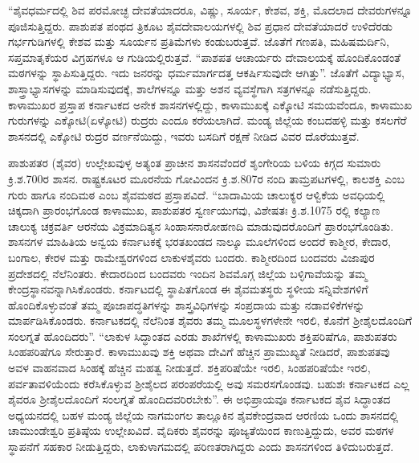 “ಶೈವಧರ್ಮದಲ್ಲಿ ಶಿವ ಪರಮೋಚ್ಛ ದೇವತೆಯಾದರೂ, ವಿಷ್ಣು, ಸೂರ್ಯ, ಕೇಶವ, ಶಕ್ತಿ, ಮೊದಲಾದ ದೇವರುಗಳನ್ನೂ ಪೂಜಿಸುತ್ತಿದ್ದರು. ಪಾಶುಪತ ಪಂಥದ ತ್ರಿಕೂಟ ಶೈವದೇವಾಲಯಗಳಲ್ಲಿ ಶಿವ ಪ್ರಧಾನ ದೇವತೆಯಾದರೆ ಉಳಿದೆರಡು ಗರ್ಭಗುಡಿಗಳಲ್ಲಿ ಕೇಶವ ಮತ್ತು ಸೂರ್ಯನ ಪ್ರತಿಮೆಗಳು ಕಂಡುಬರುತ್ತವೆ. ಜೊತೆಗೆ ಗಣಪತಿ, ಮಹಿಷಮರ್ದಿನಿ, ಸಪ್ತಮಾತೃಕೆಯರ ವಿಗ್ರಹಗಳೂ ಆ ಗುಡಿಯಲ್ಲಿರುತ್ತವೆ. “ಪಾಶಪತ ಆಚಾರ್ಯರು ದೇವಾಲಯಕ್ಕೆ ಹೊಂದಿಕೊಂಡಂತೆ ಮಠಗಳನ್ನು ಸ್ಥಾಪಿಸುತ್ತಿದ್ದರು. ಇದು ಜನರನ್ನು ಧರ್ಮಮಾರ್ಗದತ್ತ ಆಕರ್ಷಿಸುವುದೇ ಆಗಿತ್ತು”. ಜೊತೆಗೆ ವಿದ್ಯಾಭ್ಯಾಸ, ಶಾಸ್ತ್ರಾಭ್ಯಾಸಗಳನ್ನು ಮಾಡಿಸುವುದಕ್ಕೆ, ಶಾಲೆಗಳನ್ನೂ ಮತ್ತು ಅಶನ ವ್ಯವಸ್ಥೆಗಾಗಿ ಸತ್ರಗಳನ್ನೂ ನಡೆಸುತ್ತಿದ್ದರು. ಕಾಳಾಮುಖರ ಪ್ರಸ್ತಾಪ ಕರ್ನಾಟಕದ ಅನೇಕ ಶಾಸನಗಳಲ್ಲಿದ್ದು, ಕಾಳಾಮುಖಕ್ಕೆ ಎಕ್ಕೋಟಿ ಸಮಯವೆಂದೂ, ಕಾಳಾಮುಖ ಗುರುಗಳನ್ನು ಎಕ್ಕೋಟಿ(ಏಳ್ಕೋಟಿ) ರುದ್ರರು ಎಂದೂ ಕರೆಯಲಾಗಿದೆ. ಮಂಡ್ಯ ಜಿಲ್ಲೆಯ ಕಂಬದಹಳ್ಳಿ ಮತ್ತು ಕಸಲಗೆರೆ ಶಾಸನದಲ್ಲಿ ಎಕ್ಕೋಟಿ ರುದ್ರರ ವರ್ಣನೆಯಿದ್ದು, ಇವರು ಬಸದಿಗೆ ರಕ್ಷಣೆ ನೀಡಿದ ವಿವರ ದೊರೆಯುತ್ತವೆ.

ಪಾಶುಪತರ (ಶೈವರ) ಉಲ್ಲೇಖವುಳ್ಳ ಅತ್ಯಂತ ಪ್ರಾಚೀನ ಶಾಸನವೆಂದರೆ ಶೃಂಗೇರಿಯ ಬಳಿಯ ಕಿಗ್ಗದ ಸುಮಾರು ಕ್ರಿ.ಶ.700ರ ಶಾಸನ. ರಾಷ್ಟ್ರಕೂಟರ ಮೂರನೆಯ ಗೋವಿಂದನ ಕ್ರಿ.ಶ.807ರ ನಂದಿ ತಾಮ್ರಪಟಗಳಲ್ಲಿ, ಕಾಲಶಕ್ತಿ ಎಂಬ ಗುರು ಹಾಗೂ ನಂದಿಮಠ ಎಂಬ ಶೈವಮಠದ ಪ್ರಸ್ತಾಪವಿದೆ. “ಬಾದಾಮಿಯ ಚಾಲುಕ್ಯರ ಆಳ್ವಿಕೆಯ ಅವಧಿಯಲ್ಲಿ ಚಿಕ್ಕದಾಗಿ ಪ್ರಾರಂಭಗೊಂಡ ಕಾಳಾಮುಖ, ಪಾಶುಪತರ ಸ್ವರ್ಣಯುಗವು, ವಿಶೇಷತಃ ಕ್ರಿ.ಶ.1075 ರಲ್ಲಿ ಕಲ್ಯಾಣ ಚಾಲುಕ್ಯ ಚಕ್ರವರ್ತಿ ಆರನೆಯ ವಿಕ್ರಮಾದಿತ್ಯನ ಸಿಂಹಾಸನಾರೋಹಣದಿ ಮಾಡುವುದರೊಂದಿಗೆ ಪ್ರಾರಂಭಗೊಂಡಿತು. ಶಾಸನಗಳ ಮಾಹಿತಿಯ ಅನ್ವಯ ಕರ್ನಾಟಕಕ್ಕೆ ಭರತಖಂಡದ ನಾಲ್ಕೂ ಮೂಲೆಗಳಿಂದ ಅಂದರೆ ಕಾಶ್ಮೀರ, ಕೇದಾರ, ಬಂಗಾಲ, ಕೇರಳ ಮತ್ತು ರಾಮೇಶ್ವರಗಳಿಂದ ಲಾಕುಳಶೈವರು ಬಂದರು. ಕಾಶ್ಮೀರದಿಂದ ಬಂದವರು ವಿಜಾಪುರ ಪ್ರದೇಶದಲ್ಲಿ ನೆಲೆನಿಂತರು. ಕೇದಾರದಿಂದ ಬಂದವರು ಇಂದಿನ ಶಿವಮೊಗ್ಗ ಜಿಲ್ಲೆಯ ಬಳ್ಳಿಗಾವೆಯನ್ನು ತಮ್ಮ ಕೇಂದ್ರಸ್ಥಾನವನ್ನಾಗಿಸಿಕೊಂಡರು. ಕರ್ನಾಟದಲ್ಲಿ ಸ್ಥಾಪಿತಗೊಂಡ ಈ ಶೈವಮತಸ್ಥರು ಸ್ಥಳೀಯ ಸನ್ನಿವೇಶಗಳಿಗೆ ಹೊಂದಿಕೊಳ್ಳುವಂತೆ ತಮ್ಮ ಪೂಜಾಪದ್ಧತಿಗಳನ್ನು ಶಾಸ್ತ್ರವಿಧಿಗಳನ್ನು ಸಂಪ್ರದಾಯ ಮತ್ತು ನಡಾವಳಿಕೆಗಳನ್ನು ಮಾರ್ಪಡಿಸಿಕೊಂಡರು. ಕರ್ನಾಟಕದಲ್ಲಿ ನೆಲೆನಿಂತ ಶೈವರು ತಮ್ಮ ಮೂಲಸ್ಥಳಗಳೇನೇ ಇರಲಿ, ಕೊನೆಗೆ ಶ‍್ರೀಶೈಲದೊಂದಿಗೆ ಸಂಲಗ್ನತೆ ಹೊಂದಿದರು”. “ಲಾಕುಳ ಸಿದ್ಧಾಂತದ ಎರಡು ಶಾಖೆಗಳಲ್ಲಿ ಕಾಳಾಮುಖರು ಶಕ್ತಿಪರಿಷೆಗೂ, ಪಾಶುಪತರು ಸಿಂಹಪರಿಷೆಗೂ ಸೇರುತ್ತಾರೆ. ಕಾಳಾಮುಖವು ಶಕ್ತಿ ಅಥವಾ ದೇವಿಗೆ ಹೆಚ್ಚಿನ ಪ್ರಾಮುಖ್ಯತೆ ನೀಡಿದರೆ, ಪಾಶುಪತವು ಅವಳ ವಾಹನವಾದ ಸಿಂಹಕ್ಕೆ ಹೆಚ್ಚಿನ ಮಹತ್ವ ನೀಡುತ್ತದೆ. ಶಕ್ತಿಪರಿಷೆಯೇ ಇರಲಿ, ಸಿಂಹಪರಿಷೆಯೇ ಇರಲಿ, ಪರ್ವತಾವಳಿಯೆಂದು ಕರೆಸಿಕೊಳ್ಳುವ ಶ‍್ರೀಶೈಲದ ಪರಂಪರೆಯಲ್ಲಿ ಅವು ಸಮರಸಗೊಂಡವು. ಬಹುಶಃ ಕರ್ನಾಟಕದ ಎಲ್ಲ ಶೈವರೂ ಶ‍್ರೀಶೈಲದೊಂದಿಗೆ ಸಂಲಗ್ನತೆ ಹೊಂದಿದವರಿರಬೇಕು”. ಈ ಅಭಿಪ್ರಾಯವೂ ಕರ್ನಾಟಕದ ಶೈವ ಸಿದ್ಧಾಂತದ ಅಧ್ಯಯನದಲ್ಲಿ ಬಹಳ ಮಂಡ್ಯ ಜಿಲ್ಲೆಯ ನಾಗಮಂಗಲ ತಾಲ್ಲೂಕಿನ ಶೈವಕೇಂದ್ರವಾದ ಆರಣಿಯ ಒಂದು ಶಾಸನದಲ್ಲಿ ಚಾಮುಂಡೇಶ್ವರಿ ಪ್ರತಿಷ್ಠೆಯ ಉಲ್ಲೇಖವಿದೆ. ವೈದಿಕರು ಶೈವರನ್ನು ಪೂಜ್ಯತೆಯಿಂದ ಕಾಣುತ್ತಿದ್ದುದು, ಅವರ ಮಠಗಳ ಸ್ಥಾಪನೆಗೆ ಸಹಕಾರ ನೀಡುತ್ತಿದ್ದರು, ಲಾಕುಳಾಗಮದಲ್ಲಿ ಪರಿಣತರಾಗಿದ್ದರು ಎಂದು ಶಾಸನಗಳಿಂದ ತಿಳಿದುಬರುತ್ತದೆ.

